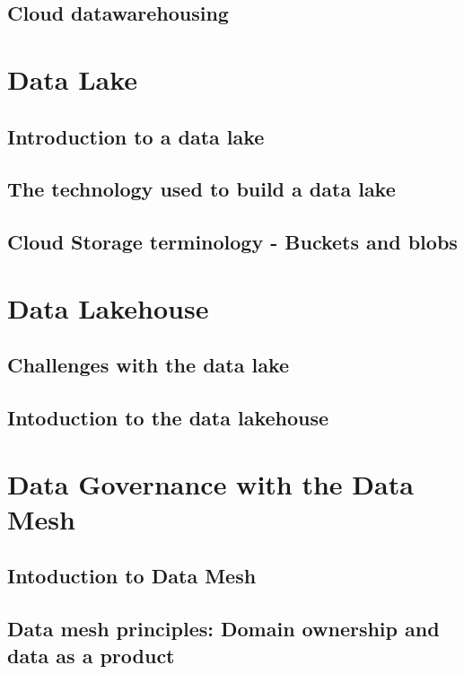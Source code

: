 \documentclass[11pt]{article}
\begin{document}
    \subsection{Cloud datawarehousing}

    \section{Data Lake}

    \subsection{Introduction to a data lake}
    
    \subsection{The technology used to build a data lake}
    
    \subsection{Cloud Storage terminology - Buckets and blobs}
    
    \section{Data Lakehouse}
    
    \subsection{Challenges with the data lake}
    
    \subsection{Intoduction to the data lakehouse}

    \section{Data Governance with the Data Mesh}
    
    \subsection{Intoduction to Data Mesh}

    \subsection{Data mesh principles: Domain ownership and data as a product}
\end{document}
